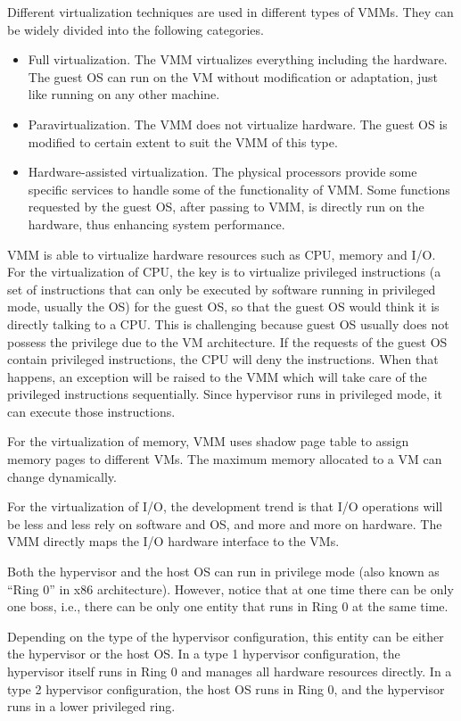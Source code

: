 Different virtualization techniques are used in different types of VMMs. They can be widely divided into the following categories.
\begin{itemize}
	\item Full virtualization. The VMM virtualizes everything including the hardware. The guest OS can run on the VM without modification or adaptation, just like running on any other machine.
	\item Paravirtualization. The VMM does not virtualize hardware. The guest OS is modified to certain extent to suit the VMM of this type.
	\item Hardware-assisted virtualization. The physical processors provide some specific services to handle some of the functionality of VMM. Some functions requested by the guest OS, after passing to VMM, is directly run on the hardware, thus enhancing system performance.
\end{itemize}

VMM is able to virtualize hardware resources such as CPU, memory and I/O. For the virtualization of CPU, the key is to virtualize privileged instructions (a set of instructions that can only be executed by software running in privileged mode, usually the OS) for the guest OS, so that the guest OS would think it is directly talking to a CPU. This is challenging because guest OS usually does not possess the privilege due to the VM architecture. If the requests of the guest OS contain privileged instructions, the CPU will deny the instructions. When that happens, an exception will be raised to the VMM which will take care of the privileged instructions sequentially. Since hypervisor runs in privileged mode, it can execute those instructions.

For the virtualization of memory, VMM uses shadow page table to assign memory pages to different VMs. The maximum memory allocated to a VM can change dynamically.

For the virtualization of I/O, the development trend is that I/O operations will be less and less rely on software and OS, and more and more on hardware. The VMM directly maps the I/O hardware interface to the VMs.

\begin{shortbox}
	Both the hypervisor and the host OS can run in privilege mode (also known as ``Ring 0'' in x86 architecture). However, notice that at one time there can be only one boss, i.e., there can be only one entity that runs in Ring 0 at the same time.
	
	Depending on the type of the hypervisor configuration, this entity can be either the hypervisor or the host OS. In a type 1 hypervisor configuration, the hypervisor itself runs in Ring 0 and manages all hardware resources directly. In a type 2 hypervisor configuration, the host OS runs in Ring 0, and the hypervisor runs in a lower privileged ring.
\end{shortbox}

